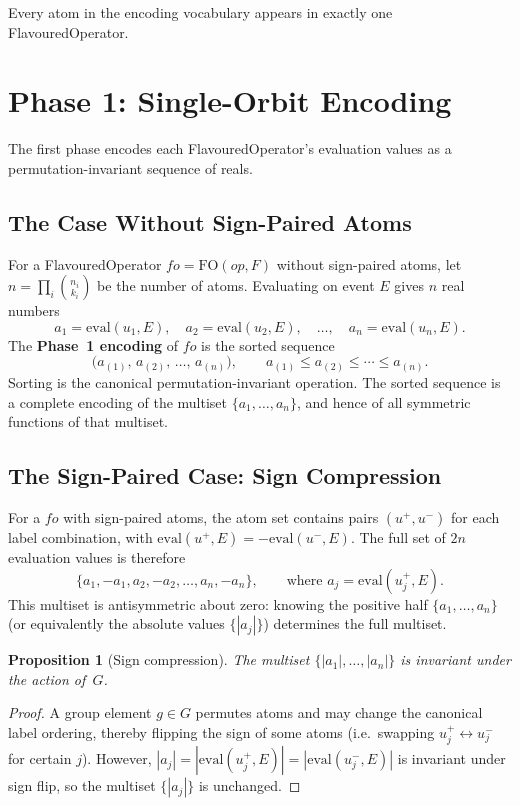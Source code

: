 \documentclass[11pt,a4paper]{article}
\theoremstyle{definition}
\theoremstyle{plain}
\newtheorem{proposition}[definition]{Proposition}
\theoremstyle{remark}
\newcommand{\eval}{\mathrm{eval}}
\newcommand{\fo}{\mathrm{FO}}
\newcommand{\comb}[2]{\binom{#1}{#2}}
\begin{document}
Every atom in the encoding vocabulary appears in exactly one FlavouredOperator.

\section{Phase 1: Single-Orbit Encoding}

The first phase encodes each FlavouredOperator's evaluation values as a
permutation-invariant sequence of reals.

\subsection{The Case Without Sign-Paired Atoms}

For a FlavouredOperator $\mathit{fo} = \fo(\mathit{op}, F)$ without
sign-paired atoms, let $n = \prod_i \comb{n_i}{k_i}$ be the number of
atoms.  Evaluating on event $E$ gives $n$ real numbers
\[
  a_1 = \eval(u_1, E),\quad a_2 = \eval(u_2, E),\quad \ldots,\quad
  a_n = \eval(u_n, E).
\]
The \textbf{Phase~1 encoding} of $\mathit{fo}$ is the sorted sequence
\[
  \bigl(a_{(1)},\, a_{(2)},\, \ldots,\, a_{(n)}\bigr),
  \qquad a_{(1)} \le a_{(2)} \le \cdots \le a_{(n)}.
\]
Sorting is the canonical permutation-invariant operation.  The sorted sequence
is a complete encoding of the multiset $\{a_1,\ldots,a_n\}$, and hence of all
symmetric functions of that multiset.

\subsection{The Sign-Paired Case: Sign Compression}
\label{sec:5c}

For a $\mathit{fo}$ with sign-paired atoms, the atom set contains pairs
$(u^+, u^-)$ for each label combination, with $\eval(u^+, E) =
-\eval(u^-, E)$.  The full set of $2n$ evaluation values is therefore
\[
  \{a_1, -a_1, a_2, -a_2, \ldots, a_n, -a_n\},
  \qquad \text{where } a_j = \eval(u^+_j, E).
\]
This multiset is antisymmetric about zero: knowing the positive half
$\{a_1,\ldots,a_n\}$ (or equivalently the absolute values $\{|a_j|\}$)
determines the full multiset.

\begin{proposition}[Sign compression]
The multiset $\{|a_1|,\ldots,|a_n|\}$ is invariant under the action of~$G$.
\end{proposition}
\begin{proof}
A group element $g \in G$ permutes atoms and may change the canonical
label ordering, thereby flipping the sign of some atoms (i.e.\ swapping $u^+_j
\leftrightarrow u^-_j$ for certain $j$).  However, $|a_j| = |\eval(u^+_j,E)|
= |\eval(u^-_j,E)|$ is invariant under sign flip, so the multiset
$\{|a_j|\}$ is unchanged.
\end{proof}
\end{document}
